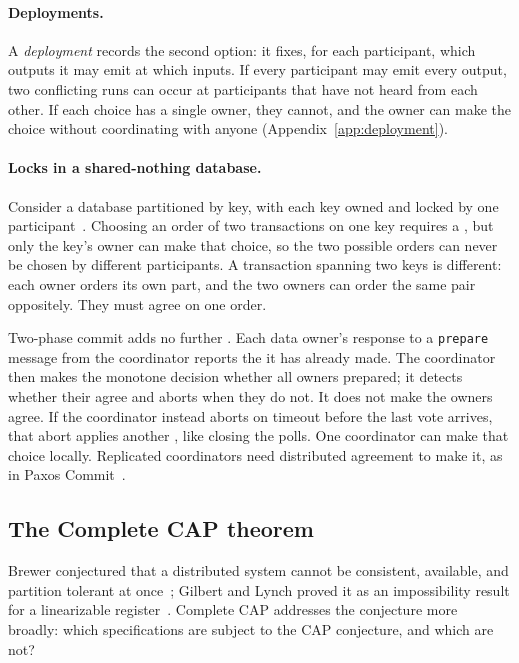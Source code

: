 \paragraph{Deployments.}
A \emph{deployment} records the second option: it fixes, for each participant,
which outputs it may emit at which inputs.  If every participant may emit every
output, two conflicting runs can occur at participants that have not heard
from each other.  If each choice has a single owner, they cannot, and the owner
can make the choice without coordinating with anyone
(Appendix~\ref{app:deployment}).

\paragraph{Locks in a shared-nothing database.}
Consider a database partitioned by key, with each key owned and locked by one
participant~\cite{stonebraker1986sharednothing}.  Choosing an order of two
transactions on one key requires a \commitment, but only the key's owner can
make that choice, so the two possible orders can never be chosen by different
participants.  A transaction spanning two keys is different: each owner orders
its own part, and the two owners can order the same pair oppositely.  They must
agree on one order.

Two-phase commit adds no further \commitment.  Each data owner's response to a \texttt{prepare} message
from the coordinator reports the
\commitment it has already made.  The coordinator then makes the monotone
decision whether all owners prepared; it detects whether their \commitments
agree and aborts when they do not.  It does not make the owners agree.  If the
coordinator instead aborts on timeout before the last vote arrives, that abort
applies another \commitment, like closing the polls.  One coordinator can make
that choice locally.  Replicated coordinators need distributed agreement to
make it, as in Paxos Commit~\cite{gray2006consensus}.

\subsection{The Complete CAP theorem}
\label{sec:complete-cap}

Brewer conjectured that a distributed system cannot be consistent, available,
and partition tolerant at once~\cite{brewer2000towards}; Gilbert and Lynch
proved it as an impossibility result for a linearizable register~\cite{gilbert2002cap}.
Complete CAP addresses the conjecture more broadly:
which specifications are subject to the CAP
conjecture, and which are not?

